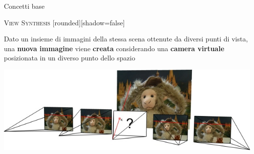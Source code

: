 \documentclass{beamer}
\begin{document}
\begin{section}{Concetti base}
\begin{frame}[t]{\textsc{View Synthesis}}
	[rounded][shadow=false]
\begin{block}{}
\center \small{ Dato un insieme di immagini della stessa scena ottenute da diversi punti di vista, una \textbf{nuova immagine} viene \textbf{creata} considerando una \textbf{camera virtuale} posizionata in un diverso punto dello spazio}
\end{block}
\vspace{1em}
\centering
\includegraphics[width=1\linewidth]{./img/nvs.jpg}
\end{frame}


\end{section}
\end{document}
